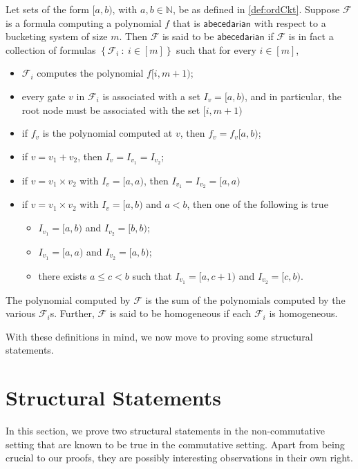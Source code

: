 \documentclass[10pt,a4paper]{article}
\def\Natural{\mathbb{N}}
\let\N\Natural
\def\inbrace#1{\left\{ #1 \right\}}
\def\setdef#1#2{\inbrace{ #1 \ : \ #2}}
\newcommand{\form}{\textbf{$\mathcal{F}$}}
\newcommand{\abcd}{\mathsf{abecedarian}}
\begin{document}
\begin{definition}\label{def:ordForm}	
	Let sets of the form $[a,b)$, with $a,b \in \N$, be as defined in \autoref{def:ordCkt}.
	Suppose $\form$ is a formula computing a polynomial $f$ that is $\abcd$ with respect to a bucketing system of size $m$. Then $\form$ is said to be $\abcd$ if $\form$ is in fact a collection of formulas $\setdef{\form_i}{i \in [m]}$ such that for every $i \in [m]$,
	\begin{itemize}
		\item $\form_i$ computes the polynomial $f[i,m+1)$;
		\item every gate $v$ in $\form_i$ is associated with a set $I_v = [a,b)$, and in particular, the root node must be associated with the set $[i, m+1)$
		\item if $f_v$ is the polynomial computed at $v$, then $f_v = f_v[a, b)$;
		\item if $v = v_1 + v_2$, then $I_v = I_{v_1} = I_{v_2}$;
		\item if $v = v_1 \times v_2$ with $I_v = [a, a)$, then $I_{v_1} = I_{v_2} = [a,a)$
		\item  if $v = v_1 \times v_2$ with $I_v = [a, b)$ and $a < b$, then one of the following is true
		\begin{itemize}
			\item $I_{v_1} = [a,b)$ and $I_{v_2} = [b,b)$;
			\item $I_{v_1} = [a,a)$ and $I_{v_2} = [a,b)$;
			\item there exists $a \leq c < b$ such that $I_{v_1} = [a, c+1)$ and $I_{v_2} = [c, b)$.
		\end{itemize} 
	\end{itemize}
	The polynomial computed by $\form$ is the sum of the polynomials computed by the various $\form_i$s.
	Further, $\form$ is said to be homogeneous if each $\form_i$ is homogeneous.
\end{definition}

\hspace{.5em}

\noindent With these definitions in mind, we now move to proving some structural statements. 

\section{Structural Statements}\label{sec:structural-statements}

In this section, we prove two structural statements in the non-commutative setting that are known to be true in the commutative setting. 
Apart from being crucial to our proofs, they are possibly interesting observations in their own right.
\end{document}
